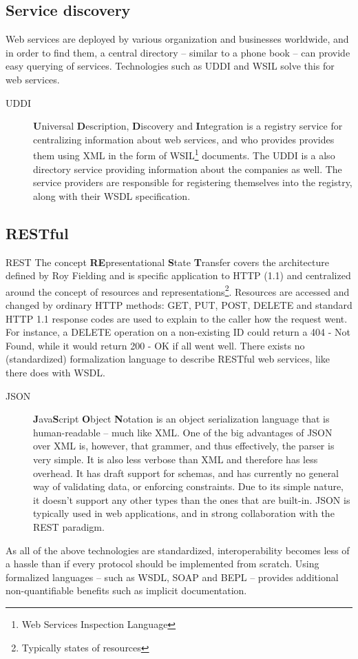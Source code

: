 \subsection{Service discovery}
Web services are deployed by various organization and businesses worldwide, and in order to find them, a central directory -- similar to a phone book -- can provide easy querying of services. Technologies such as UDDI and WSIL solve this for web services.
\begin{description}
\item[UDDI] \textbf{U}niversal \textbf{D}escription, \textbf{D}iscovery and \textbf{I}ntegration is a registry service for centralizing information about web services, and who provides provides them using XML in the form of WSIL\footnote{Web Services Inspection Language} documents. The UDDI is a also directory service providing information about the companies as well. The service providers are responsible for registering themselves into the registry, along with their WSDL specification.
\end{description}


\subsection{RESTful}
REST The concept \textbf{RE}presentational \textbf{S}tate \textbf{T}ransfer covers the architecture defined by Roy Fielding and is specific application to HTTP (1.1) and centralized around the concept of resources and representations\footnote{Typically states of resources}. Resources are accessed and changed by ordinary HTTP methods: GET, PUT, POST, DELETE and standard HTTP 1.1 response codes are used to explain to the caller how the request went. For instance, a DELETE operation on a non-existing ID could return a 404 - Not Found, while it would return 200 - OK if all went well. There exists no (standardized) formalization language to describe RESTful web services, like there does with WSDL.
\begin{description}
\item[JSON] \textbf{J}ava\textbf{S}cript \textbf{O}bject \textbf{N}otation is an object serialization language that is human-readable -- much like XML. One of the big advantages of JSON over XML is, however, that grammer, and thus effectively, the parser is very simple. It is also less verbose than XML and therefore has less overhead. It has draft support for schemas, and has currently no general way of validating data, or enforcing constraints. Due to its simple nature, it doesn't support any other types than the ones that are built-in. JSON is typically used in web applications, and in strong collaboration with the REST paradigm.

\end{description}As all of the above technologies are standardized, interoperability becomes less of a hassle than if every protocol should be implemented from scratch. Using formalized languages -- such as WSDL, SOAP and BEPL -- provides additional non-quantifiable benefits such as implicit documentation.